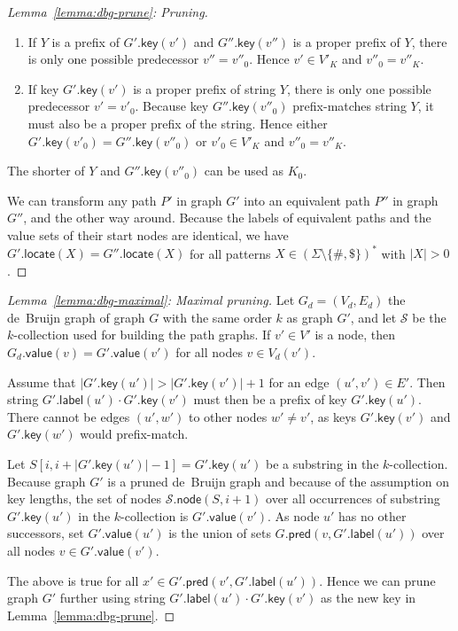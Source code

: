\documentclass[twoside,leqno,twocolumn]{article}
\newcommand{\set}[1]{\ensuremath{\{ #1 \}}}
\newcommand{\abs}[1]{\ensuremath{\lvert #1 \rvert}}
\newcommand{\locate}{\ensuremath{\mathsf{locate}}}
\newcommand{\glabel}{\ensuremath{\mathsf{label}}}
\newcommand{\gpred}{\ensuremath{\mathsf{pred}}}
\newcommand{\gkey}{\ensuremath{\mathsf{key}}}
\newcommand{\gvalue}{\ensuremath{\mathsf{value}}}
\newcommand{\gnode}{\ensuremath{\mathsf{node}}}
\newcommand{\kcollection}[1]{$#1$\nobreakdash-collection}
\newcommand{\patternset}{\ensuremath{(\Sigma \setminus \set{\#, \$})^{\ast}}}
\begin{document}
\begin{proof}[Lemma~\ref{lemma:dbg-prune}: Pruning]
\begin{enumerate}
\item If $Y$ is a prefix of $G'.\gkey(v')$ and $G''.\gkey(v'')$ is a proper prefix of $Y$, there is only one possible predecessor $v'' = v''_{0}$. Hence $v' \in V'_{K}$ and $v''_{0} = v''_{K}$.

\item If key $G'.\gkey(v')$ is a proper prefix of string $Y$, there is only one possible predecessor $v' = v'_{0}$. Because key $G''.\gkey(v''_{0})$ prefix-matches string $Y$, it must also be a proper prefix of the string. Hence either $G'.\gkey(v'_{0}) = G''.\gkey(v''_{0})$ or $v'_{0} \in V'_{K}$ and $v''_{0} = v''_{K}$.
\end{enumerate}
The shorter of $Y$ and $G''.\gkey(v''_{0})$ can be used as $K_{0}$.

We can transform any path $P'$ in graph $G'$ into an equivalent path $P''$ in graph $G''$, and the other way around. Because the labels of equivalent paths and the value sets of their start nodes are identical, we have $G'.\locate(X) = G''.\locate(X)$ for all patterns $X \in \patternset$ with $\abs{X} > 0$.
\end{proof}

\begin{proof}[Lemma~\ref{lemma:dbg-maximal}: Maximal pruning]
Let $G_{d} = (V_{d}, E_{d})$ the de~Bruijn graph of graph $G$ with the same order $k$ as graph $G'$, and let $\mathcal{S}$ be the \kcollection{k} used for building the path graphs. If $v' \in V'$ is a node, then $G_{d}.\gvalue(v) = G'.\gvalue(v')$ for all nodes $v \in V_{d}(v')$.

Assume that $\abs{G'.\gkey(u')} > \abs{G'.\gkey(v')}+1$ for an edge $(u', v') \in E'$. Then string $G'.\glabel(u') \cdot G'.\gkey(v')$ must then be a prefix of key $G'.\gkey(u')$. There cannot be edges $(u', w')$ to other nodes $w' \ne v'$, as keys $G'.\gkey(v')$ and $G'.\gkey(w')$ would prefix-match.

Let $S[i, i+\abs{G'.\gkey(u')}-1] = G'.\gkey(u')$ be a substring in the \kcollection{k}. Because graph $G'$ is a pruned de~Bruijn graph and because of the assumption on key lengths, the set of nodes $\mathcal{S}.\gnode(S, i+1)$ over all occurrences of substring $G'.\gkey(u')$ in the \kcollection{k} is $G'.\gvalue(v')$. As node $u'$ has no other successors, set $G'.\gvalue(u')$ is the union of sets $G.\gpred(v, G'.\glabel(u'))$ over all nodes $v \in G'.\gvalue(v')$.

The above is true for all $x' \in G'.\gpred(v', G'.\glabel(u'))$. Hence we can prune graph $G'$ further using string $G'.\glabel(u') \cdot G'.\gkey(v')$ as the new key in Lemma~\ref{lemma:dbg-prune}.
\end{proof}
\end{document}
